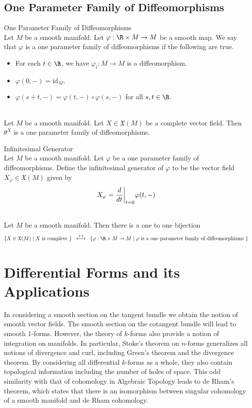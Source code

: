 \documentclass[a4paper]{article}
\begin{document}
\subsection{One Parameter Family of Diffeomorphisms}
\begin{defn}{One Parameter Family of Diffeomorphisms}{}\\
Let $M$ be a smooth manifold. Let $\varphi:\R\times M\to M$ be a smooth map. We say that $\varphi$ is a one parameter family of diffeomorphisms if the following are true. 
\begin{itemize}
\item For each $t\in\R$, we have $\varphi_t:M\to M$ is a diffeomorphism. 
\item $\varphi(0,-)=\text{id}_M$. 
\item $\varphi(s+t,-)=\varphi(t,-)\circ\varphi(s,-)$ for all $s,t\in\R$. 
\end{itemize}
\end{defn}

\begin{eg}{}{}\\
Let $M$ be a smooth manifold. Let $X\in\mathfrak{X}(M)$ be a complete vector field. Then $\theta^X$ is a one parameter family of diffeomorphisms. 
\end{eg}

\begin{defn}{Infinitesimal Generator}{}\\
Let $M$ be a smooth manifold. Let $\varphi$ be a one parameter family of diffeomorphisms. Define the infinitesimal generator of $\varphi$ to be the vector field $X_\varphi\in\mathfrak{X}(M)$ given by $$X_\varphi=\frac{d}{dt}\bigg{|}_{t=0}\varphi(t,-)$$
\end{defn}

\begin{prp}{}{}\\
Let $M$ be a smooth manifold. Then there is a one to one bijection $$\{X\in\mathfrak{X}(M)\;|\;X\text{ is complete }\}\;\;\overset{1:1}{\longleftrightarrow}\;\;\{\varphi:\R\times M\to M\;|\;\varphi\text{ is a one parameter family of diffeomorphisms }\}$$
\end{prp}

\pagebreak
\section{Differential Forms and its Applications}
In considering a smooth section on the tangent bundle we obtain the notion of smooth vector fields. The smooth section on the cotangent bundle will lead to smooth $1$-forms. However, the theory of $k$-forms also provide a notion of integration on manifolds. In particular, Stoke's theorem on $n$-forms generalizes all notions of divergence and curl, including Green's theorem and the divergence theorem. By considering all differential $k$-forms as a whole, they also contain topological information including the number of holes of space. This odd similarity with that of cohomology in Algebraic Topology leads to de Rham's theorem, which states that there is an isomorphism between singular cohomology of a smooth manifold and de Rham cohomology. 
\end{document}
